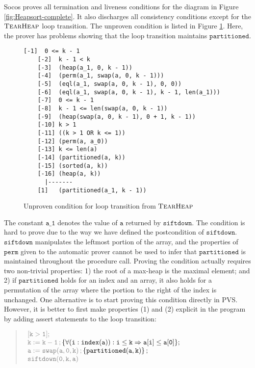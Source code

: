 \documentclass[english,submission]{eptcs}
\begin{document}
Socos proves all termination and liveness conditions for the diagram
in Figure \ref{fig:Heapsort-complete}. It also discharges all consistency
conditions except for the $\textsc{TearHeap}$ loop transition. The
unproven condition is listed in Figure \ref{fig:Unproved-condition-Loop}.
Here, the prover has problems showing that the loop transition maintains
$\mathtt{partitioned}$. 
\begin{figure}
\begin{lstlisting}[basicstyle={\small\ttfamily},frame=lines]
    [-1]  0 <= k - 1
    [-2]  k - 1 < k
    [-3]  (heap(a_1, 0, k - 1))
    [-4]  (perm(a_1, swap(a, 0, k - 1)))
    [-5]  (eql(a_1, swap(a, 0, k - 1), 0, 0))
    [-6]  (eql(a_1, swap(a, 0, k - 1), k - 1, len(a_1)))
    [-7]  0 <= k - 1
    [-8]  k - 1 <= len(swap(a, 0, k - 1))
    [-9]  (heap(swap(a, 0, k - 1), 0 + 1, k - 1))
    [-10] k > 1
    [-11] ((k > 1 OR k <= 1))
    [-12] (perm(a, a_0))
    [-13] k <= len(a)
    [-14] (partitioned(a, k))
    [-15] (sorted(a, k))
    [-16] (heap(a, k))
      |-------
    [1]   (partitioned(a_1, k - 1))
\end{lstlisting}
\caption{Unproven condition for loop transition from $\textsc{TearHeap}$ \label{fig:Unproved-condition-Loop}}
\end{figure}
The constant $\mathtt{a\_1}$ denotes the value of $\mathtt{a}$
returned by $\mathtt{siftdown}$. The condition is hard to prove due to
the way we have defined the postcondition of $\mathtt{siftdown}$.
$\mathtt{siftdown}$ manipulates the leftmost portion of the array, and
the properties of $\mathtt{perm}$ given to the automatic prover cannot
be used to infer that $\mathtt{partitioned}$ is maintained throughout
the procedure call. Proving the condition actually requires two
non-trivial properties: 1) the root of a max-heap is the maximal
element; and 2) if $\mathtt{partitioned}$ holds for an index and an
array, it also holds for a permutation of the array where the portion
to the right of the index is unchanged.  One alternative is to start
proving this condition directly in PVS.  However, it is better to
first make properties (1) and (2) explicit in the program by adding
assert statements to the loop transition:
\begin{quote}
$\begin{array}[t]{l}
\mathtt{\color{gray}{[k>1];}}\\
\mathtt{\color{gray}{k:=k-1\,;}\,\color{black}{\{\forall(i:index(a)):i\le k\Rightarrow a[i]\le a[0]\};}} \\
\mathtt{\color{gray}{a:=swap(a,0,k)\,;}\,\color{black}{\{partitioned(a,k)\}\,;}} \\
\mathtt{\color{gray}{siftdown(0,k,a)}}
\end{array}$
\end{quote}
\end{document}
